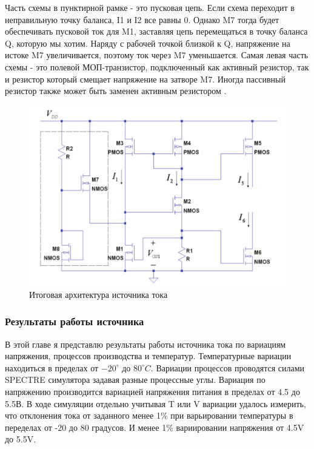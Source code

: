 \documentclass[a4paper,12pt]{article} %
\begin{document}
Часть схемы в пунктирной рамке - это пусковая цепь. Если схема переходит в  неправильную точку баланса, I1 и I2 все равны 0. Однако M7 тогда будет обеспечивать пусковой ток для M1, заставляя цепь перемещаться в точку баланса Q, которую мы хотим. Наряду с рабочей точкой близкой к Q, напряжение на истоке M7  увеличивается, поэтому ток через M7 уменьшается. Самая левая часть схемы - это полевой МОП-транзистор, подключенный как активный резистор, так и резистор  который смещает напряжение на затворе M7. Иногда пассивный резистор также может быть заменен активным резистором \cite{op_amp_comp13}. 




\begin{figure}[H]
    \includegraphics[width=\textwidth]{current_source/design1.png}
    \caption{Итоговая архитектура источника тока}
    \label{pic:current_design1}
\end{figure}




\subsubsection{Результаты работы источника}


В этой главе я представлю результаты работы источника тока по вариациям напряжения, процессов производства и температур. Температурные вариации находиться в пределах от $ -20^{\circ} $ до $ 80^{\circ}C $. Вариации процессов проводятся силами SPECTRE симулятора задавая разные процессные углы. Вариация по напряжению производится вариацией напряжения питания в пределах от 4.5 до 5.5В.  В ходе симуляции отдельно учитывая T или V вариации удалось измерить, что отклонения тока от заданного менее 1\% при варьировании температуры в переделах от -20 до 80 градусов. И менее 1\% вариировании напряжения от 4.5V до 5.5V. 
\end{document}
